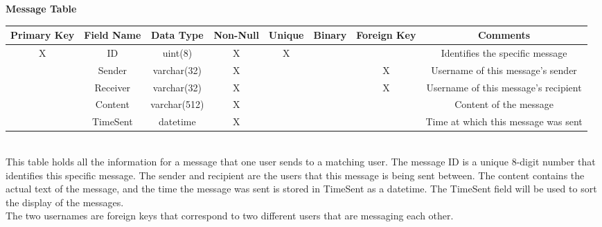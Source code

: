 \documentclass{article}
\begin{document}
\begin{enumerate}
        \textbf{Message Table}\\
        \begin{adjustbox}{width=1.2\textwidth}
            \begin{tabular}{|c|c|c|c|c|c|c|c|}
                \hline
                Primary Key & Field Name & Data Type & Non-Null & Unique & Binary & Foreign Key & Comments \\ \hline
                X & ID & uint(8) & X & X &  &  & Identifies the specific message\\ \hline
                 & Sender & varchar(32) & X &  &  & X & Username of this message's sender\\ \hline
                 & Receiver & varchar(32) & X &  &  & X & Username of this message's recipient\\ \hline
                 & Content & varchar(512) & X &  &  &  & Content of the message\\ \hline
                 & TimeSent & datetime & X &  &  &  & Time at which this message was sent\\ \hline
            \end{tabular}
        \end{adjustbox}\\
        This table holds all the information for a message that one user sends to a matching user. The message ID is a unique 8-digit number that identifies this specific message. The sender and recipient are the users that this message is being sent between. The content contains the actual text of the message, and the time the message was sent is stored in TimeSent as a datetime. The TimeSent field will be used to sort the display of the messages.\\
        The two usernames are foreign keys that correspond to two different users that are messaging each other.\\
    \end{enumerate}
\end{document}
